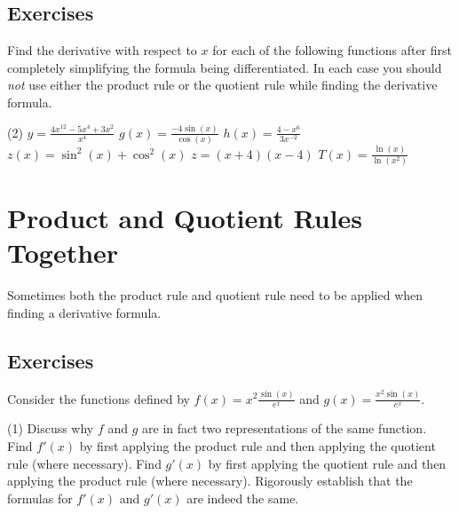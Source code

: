 \documentclass[10pt,oneside,]{book}
\theoremstyle{plain}
\theoremstyle{definition}
\numberwithin{equation}{section}
\newcommand{\fe}[2]{#1\mathopen{}\left(#2\right)\mathclose{}}
\newcommand{\fd}[1]{#1'}
\begin{document}
\subsection[Exercises]{Exercises}\label{exercises-39}
Find the derivative with respect to \(x\) for each of the following functions after first completely simplifying the formula being differentiated.  In each case you should \emph{not} use either the product rule or the quotient rule while finding the derivative formula.%
\par
\begin{exercisegroup}(2)
\exercise[1.]\hypertarget{exercise-385}{\null}\(y=\frac{4x^{12}-5x^4+3x^2}{x^4}\)%
\exercise[2.]\hypertarget{exercise-386}{\null}\(\fe{g}{x}=\frac{-4\fe{\sin}{x}}{\fe{\cos}{x}}\)%
\exercise[3.]\hypertarget{exercise-387}{\null}\(\fe{h}{x}=\frac{4-x^6}{3x^{-2}}\)%
\exercise[4.]\hypertarget{exercise-388}{\null}\(\fe{z}{x}=\fe{\sin^2}{x}+\fe{\cos^2}{x}\)%
\exercise[5.]\hypertarget{exercise-389}{\null}\(z=(x+4)(x-4)\)%
\exercise[6.]\hypertarget{exercise-390}{\null}\(\fe{T}{x}=\frac{\fe{\ln}{x}}{\fe{\ln}{x^2}}\)%
\end{exercisegroup}
\par\smallskip\noindent
\typeout{************************************************}
\typeout{************************************************}
\section[Product, Quotient Rules Together]{Product and Quotient Rules Together}\label{section-product-and-quotient-together}
Sometimes both the product rule and quotient rule need to be applied when finding a derivative formula.%
\typeout{************************************************}
\typeout{************************************************}
\subsection[Exercises]{Exercises}\label{exercises-40}
Consider the functions defined by \(\fe{f}{x}=x^2\frac{\fe{\sin}{x}}{e^x}\) and \(\fe{g}{x}=\frac{x^2\fe{\sin}{x}}{e^x}\).%
\par
\begin{exercisegroup}(1)
\exercise[1.]\hypertarget{exercise-391}{\null}Discuss why \(f\) and \(g\) are in fact two representations of the same function.%
\exercise[2.]\hypertarget{exercise-392}{\null}Find \(\fe{\fd{f}}{x}\) by first applying the product rule and then applying the quotient rule (where necessary).%
\exercise[3.]\hypertarget{exercise-393}{\null}Find \(\fe{\fd{g}}{x}\) by first applying the quotient rule and then applying the product rule (where necessary).%
\exercise[4.]\hypertarget{exercise-394}{\null}Rigorously establish that the formulas for \(\fe{\fd{f}}{x}\) and \(\fe{\fd{g}}{x}\) are indeed the same.%
\end{exercisegroup}
\par\smallskip\noindent
\typeout{************************************************}
\typeout{************************************************}
\end{document}
